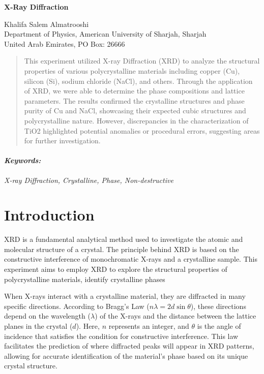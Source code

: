 \documentclass[11pt]{article}
\begin{document}
	
	\begin{titlepage}
		\begin{center}
			\begin{Large}
				\textbf{X-Ray Diffraction} \\
			\end{Large}
			\vspace{0.5cm}
			Khalifa Salem Almatrooshi \\
			\vspace{0.5cm}
			Department of Physics, American University of Sharjah, Sharjah \\
			United Arab Emirates, PO Box: 26666
		\end{center}
		\begin{abstract}
			\noindent
			This experiment utilized X-ray Diffraction (XRD) to analyze the structural properties of various polycrystalline materials including copper (Cu), silicon (Si), sodium chloride (NaCl), and others. Through the application of XRD, we were able to determine the phase compositions and lattice parameters. The results confirmed the crystalline structures and phase purity of Cu and NaCl, showcasing their expected cubic structures and polycrystalline nature. However, discrepancies in the characterization of TiO2 highlighted potential anomalies or procedural errors, suggesting areas for further investigation.
		\end{abstract}
		\paragraph{\textit{Keywords:}} \textit{X-ray Diffraction, Crystalline, Phase, Non-destructive}
	\end{titlepage}
	
\clearpage
	
	\section{Introduction}	
	
	XRD is a fundamental analytical method used to investigate the atomic and molecular structure of a crystal. The principle behind XRD is based on the constructive interference of monochromatic X-rays and a crystalline sample. This experiment aims to employ XRD to explore the structural properties of polycrystalline materials, identify crystalline phases
	
	When X-rays interact with a crystalline material, they are diffracted in many specific directions. According to Bragg's Law (\(n\lambda = 2d\sin\theta\)), these directions depend on the wavelength (\(\lambda\)) of the X-rays and the distance between the lattice planes in the crystal (\(d\)). Here, \(n\) represents an integer, and \(\theta\) is the angle of incidence that satisfies the condition for constructive interference. This law facilitates the prediction of where diffracted peaks will appear in XRD patterns, allowing for accurate identification of the material's phase based on its unique crystal structure.
	
\end{document}

